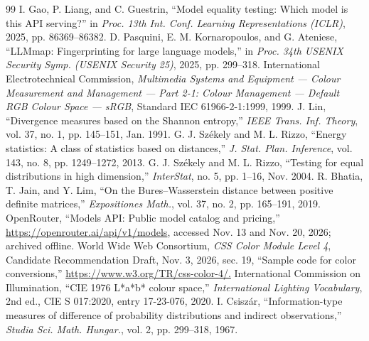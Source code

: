 \documentclass[10pt,letterpaper]{article}
\theoremstyle{definition}
\begin{document}
\begin{thebibliography}{99}
 I. Gao, P. Liang, and C. Guestrin, ``Model equality testing: Which model is this API serving?'' in \emph{Proc. 13th Int. Conf. Learning Representations (ICLR)}, 2025, pp. 86369--86382.
 D. Pasquini, E. M. Kornaropoulos, and G. Ateniese, ``LLMmap: Fingerprinting for large language models,'' in \emph{Proc. 34th USENIX Security Symp. (USENIX Security 25)}, 2025, pp. 299--318.
 International Electrotechnical Commission, \emph{Multimedia Systems and Equipment --- Colour Measurement and Management --- Part 2-1: Colour Management --- Default RGB Colour Space --- sRGB}, Standard IEC 61966-2-1:1999, 1999.
 J. Lin, ``Divergence measures based on the Shannon entropy,'' \emph{IEEE Trans. Inf. Theory}, vol. 37, no. 1, pp. 145--151, Jan. 1991.
 G. J. Sz\'{e}kely and M. L. Rizzo, ``Energy statistics: A class of statistics based on distances,'' \emph{J. Stat. Plan. Inference}, vol. 143, no. 8, pp. 1249--1272, 2013.
 G. J. Sz\'{e}kely and M. L. Rizzo, ``Testing for equal distributions in high dimension,'' \emph{InterStat}, no. 5, pp. 1--16, Nov. 2004.
 R. Bhatia, T. Jain, and Y. Lim, ``On the Bures--Wasserstein distance between positive definite matrices,'' \emph{Expositiones Math.}, vol. 37, no. 2, pp. 165--191, 2019.
 OpenRouter, ``Models API: Public model catalog and pricing,'' \url{https://openrouter.ai/api/v1/models}, accessed Nov. 13 and Nov. 20, 2026; archived offline.
 World Wide Web Consortium, \emph{CSS Color Module Level 4}, Candidate Recommendation Draft, Nov. 3, 2026, sec. 19, ``Sample code for color conversions,'' \url{https://www.w3.org/TR/css-color-4/.}
 International Commission on Illumination, ``CIE 1976 L*a*b* colour space,'' \emph{International Lighting Vocabulary}, 2nd ed., CIE S 017:2020, entry 17-23-076, 2020.
 I. Csisz\'{a}r, ``Information-type measures of difference of probability distributions and indirect observations,'' \emph{Studia Sci. Math. Hungar.}, vol. 2, pp. 299--318, 1967.
\end{thebibliography}
\end{document}
